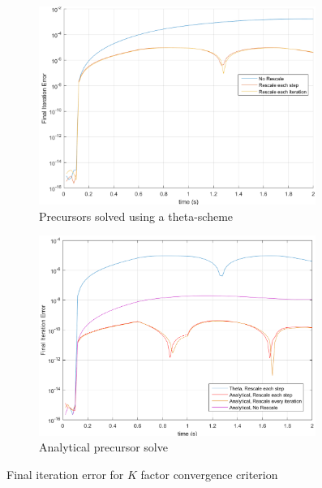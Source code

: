 \documentclass{elsarticle}
\begin{document}
\begin{figure}[!htbp]
\centering
\begin{subfigure}[b]{0.49\textwidth}
\centering
\includegraphics[width=0.99\textwidth]{figures/iter_error.png}
\caption{Precursors solved using a theta-scheme}
\label{fig:iter_err}
\end{subfigure}
\begin{subfigure}[b]{0.49\textwidth}
\centering
\includegraphics[width=0.99\textwidth]{figures/iter_error_an.png}
\caption{Analytical precursor solve}
\label{fig:iter_err_an}
\end{subfigure}
\caption{Final iteration error for $K$ factor convergence criterion}
\end{figure}

\clearpage
\newpage
\end{document}
